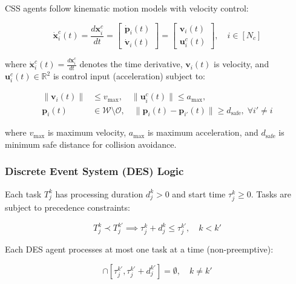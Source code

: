 \documentclass[manuscript,screen,review]{acmart}
\begin{document}
CSS agents follow kinematic motion models with velocity control:

\begin{equation}
\dot{\mathbf{x}}_i^c(t) = \frac{d\mathbf{x}_i^c}{dt} = 
\begin{bmatrix}
\dot{\mathbf{p}}_i(t) \\
\dot{\mathbf{v}}_i(t)
\end{bmatrix}
= 
\begin{bmatrix}
\mathbf{v}_i(t) \\
\mathbf{u}_i^c(t)
\end{bmatrix}, \quad i \in [N_c]
\label{eq:css_dynamics}
\end{equation}

where $\dot{\mathbf{x}}_i^c(t) = \frac{d\mathbf{x}_i^c}{dt}$ denotes the time 
derivative, $\mathbf{v}_i(t)$ is velocity, and $\mathbf{u}_i^c(t) \in \mathbb{R}^2$ 
is control input (acceleration) subject to:

\begin{equation}
\begin{aligned}
\|\mathbf{v}_i(t)\| &\leq v_{\max}, \quad
\|\mathbf{u}_i^c(t)\| \leq a_{\max}, \\
\mathbf{p}_i(t) &\in \mathcal{W} \setminus \mathcal{O}, \quad
\|\mathbf{p}_i(t) - \mathbf{p}_{i'}(t)\| \geq d_{\text{safe}}, \; \forall i' \neq i
\end{aligned}
\label{eq:css_constraints}
\end{equation}

where $v_{\max}$ is maximum velocity, $a_{\max}$ is maximum acceleration, 
and $d_{\text{safe}}$ is minimum safe distance for collision avoidance.

\subsubsection{Discrete Event System (DES) Logic}

Each task $T_j^k$ has processing duration $d_j^k > 0$ and start time 
$\tau_j^k \geq 0$. Tasks are subject to precedence constraints:

\begin{equation}
T_j^k \prec T_j^{k'} \implies \tau_j^k + d_j^k \leq \tau_j^{k'}, \quad k < k'
\label{eq:precedence}
\end{equation}

Each DES agent processes at most one task at a time (non-preemptive):

\begin{equation}
[\tau_j^k, \tau_j^k + d_j^k] \cap [\tau_j^{k'}, \tau_j^{k'} + d_j^{k'}] = \emptyset, \quad k \neq k'
\label{eq:non_preemptive}
\end{equation}
\end{document}

